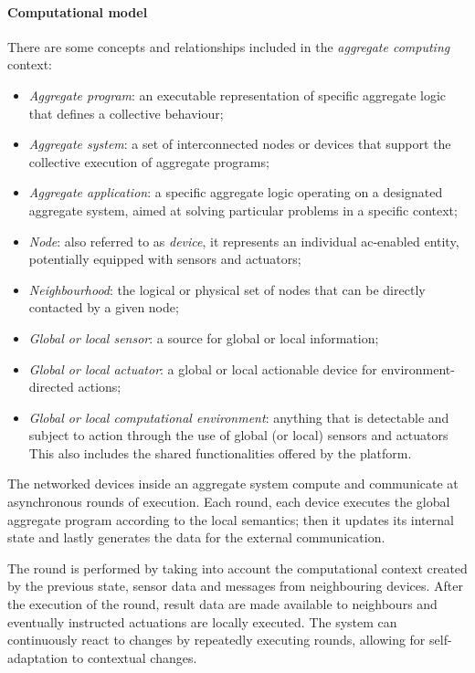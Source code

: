 \paragraph{Computational model}
There are some concepts and relationships included in the \emph{aggregate computing} context:
\begin{itemize}
    \item \emph{Aggregate program}: an executable representation of specific aggregate logic that defines a collective behaviour;
    \item \emph{Aggregate system}: a set of interconnected nodes or devices that support the collective execution of aggregate programs;
    \item \emph{Aggregate application}: a specific aggregate logic operating on a designated aggregate system, aimed at
        solving particular problems in a specific context;
    \item \emph{Node}: also referred to as \emph{device}, it represents an individual \ac{ac}-enabled entity, potentially
        equipped with sensors and actuators;
    \item \emph{Neighbourhood}: the logical or physical set of nodes that can be directly contacted by a given node;
    \item \emph{Global or local sensor}: a source for global or local information;
    \item \emph{Global or local actuator}: a global or local actionable device for environment-directed actions;
    \item \emph{Global or local computational environment}: anything that is detectable and subject to action through the
        use of global (or local) sensors and actuators
        This also includes the shared functionalities offered by the platform.
\end{itemize}

The networked devices inside an aggregate system compute and communicate at asynchronous rounds of execution.
Each round, each device executes the global aggregate program according to the local semantics; then it updates its internal
state and lastly generates the data for the external communication.

The round is performed by taking into account the computational context created by the previous state, sensor data and
messages from neighbouring devices.
After the execution of the round, result data are made available to neighbours and eventually instructed actuations are
locally executed.
The system can continuously react to changes by repeatedly executing rounds, allowing for self-adaptation to contextual changes.

